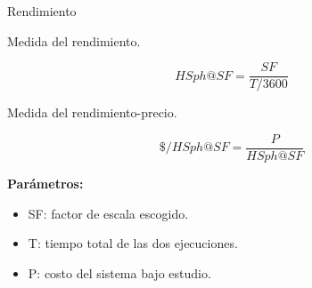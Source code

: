 		\begin{frame}{Rendimiento}		
			
			{\color{ChetwodeBlue}\large Medida del rendimiento.}
								
					$$ HSph@SF = \frac{SF}{T/3600} $$				
				
			{\color{ChetwodeBlue}\large Medida del rendimiento-precio.}
			
					$$ \$/HSph@SF = \frac{P}{HSph@SF} $$
					
			\begin{tcolorbox}[colback=blue!5,colframe=blue!15]
				\textbf{Parámetros:}
		
				\begin{itemize}
					\fontsize{10}{10}\selectfont
					\item SF: factor de escala escogido.
					\item T: tiempo total de las dos ejecuciones.
					\item P: costo del sistema bajo estudio.
				\end{itemize}
			\end{tcolorbox}
		\end{frame}
				 